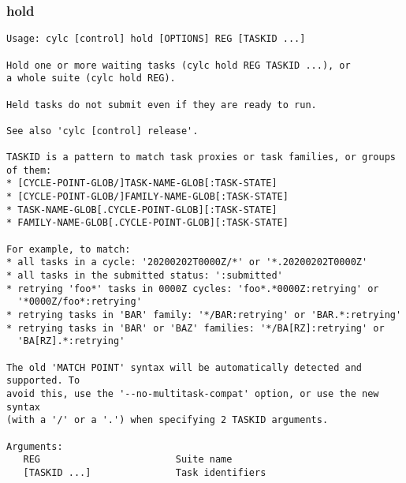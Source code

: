 \subsubsection{hold}
\label{hold}
\begin{lstlisting}
Usage: cylc [control] hold [OPTIONS] REG [TASKID ...] 

Hold one or more waiting tasks (cylc hold REG TASKID ...), or
a whole suite (cylc hold REG).

Held tasks do not submit even if they are ready to run.

See also 'cylc [control] release'.

TASKID is a pattern to match task proxies or task families, or groups of them:
* [CYCLE-POINT-GLOB/]TASK-NAME-GLOB[:TASK-STATE]
* [CYCLE-POINT-GLOB/]FAMILY-NAME-GLOB[:TASK-STATE]
* TASK-NAME-GLOB[.CYCLE-POINT-GLOB][:TASK-STATE]
* FAMILY-NAME-GLOB[.CYCLE-POINT-GLOB][:TASK-STATE]

For example, to match:
* all tasks in a cycle: '20200202T0000Z/*' or '*.20200202T0000Z'
* all tasks in the submitted status: ':submitted'
* retrying 'foo*' tasks in 0000Z cycles: 'foo*.*0000Z:retrying' or
  '*0000Z/foo*:retrying'
* retrying tasks in 'BAR' family: '*/BAR:retrying' or 'BAR.*:retrying'
* retrying tasks in 'BAR' or 'BAZ' families: '*/BA[RZ]:retrying' or
  'BA[RZ].*:retrying'

The old 'MATCH POINT' syntax will be automatically detected and supported. To
avoid this, use the '--no-multitask-compat' option, or use the new syntax
(with a '/' or a '.') when specifying 2 TASKID arguments.

Arguments:
   REG                        Suite name
   [TASKID ...]               Task identifiers


\end{lstlisting}
